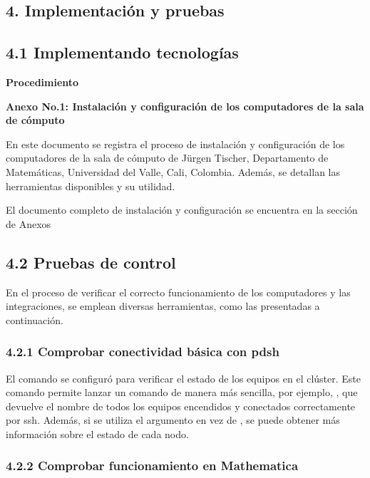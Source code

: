 \begin{spacing}{1.5}
  \begin{tightcenter}
    \section{4. Implementación y pruebas}
    \mylinespacing
  \end{tightcenter}

  \subsection{4.1 Implementando tecnologías}

  \textbf{Procedimiento}

  \textbf{Anexo No.1: Instalación y configuración de los computadores de la
    sala
    de cómputo}

  En este documento se registra el proceso de instalación y configuración de
  los
  computadores de la sala de cómputo de Jürgen Tischer, Departamento de
  Matemáticas, Universidad del Valle, Cali, Colombia. Además, se detallan las
  herramientas disponibles y su utilidad.

  El documento completo de instalación y configuración se encuentra en la
  sección
  de Anexos

  \subsection{4.2 Pruebas de control}

  En el proceso de verificar el correcto funcionamiento de los computadores y las integraciones, se emplean diversas herramientas, como las presentadas a continuación.

  \subsubsection {4.2.1 Comprobar conectividad básica con pdsh}

  El comando  se configuró para verificar el estado de los equipos
  en
  el clúster. Este comando permite lanzar un comando de manera más sencilla,
  por
  ejemplo, , que devuelve el nombre de
  todos los
  equipos encendidos y conectados correctamente por ssh. Además, si se utiliza
  el
  argumento  en vez de , se puede obtener más
  información sobre el estado de cada nodo.

  \subsubsection {4.2.2 Comprobar funcionamiento en Mathematica}


\end{spacing}

